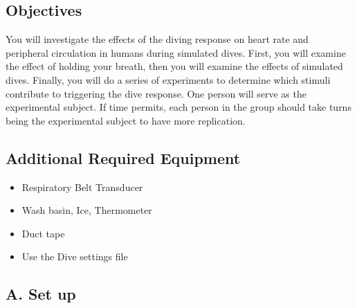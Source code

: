 \documentclass[
  letterpaper,
  DIV=11,
  numbers=noendperiod,
  oneside]{scrartcl}
\providecommand{\tightlist}{%
  \setlength{\itemsep}{0pt}\setlength{\parskip}{0pt}}\usepackage{longtable,booktabs,array}
\begin{document}
\hypertarget{objectives-1}{%
\subsection{Objectives}\label{objectives-1}}

You will investigate the effects of the diving response on heart rate
and peripheral circulation in humans during simulated dives. First, you
will examine the effect of holding your breath, then you will examine
the effects of simulated dives. Finally, you will do a series of
experiments to determine which stimuli contribute to triggering the dive
response. One person will serve as the experimental subject. If time
permits, each person in the group should take turns being the
experimental subject to have more replication.

\hypertarget{additional-required-equipment}{%
\subsection{Additional Required
Equipment}\label{additional-required-equipment}}

\begin{itemize}
\tightlist
\item
  Respiratory Belt Transducer
\item
  Wash basin, Ice, Thermometer
\item
  Duct tape
\item
  Use the Dive settings file
\end{itemize}

\hypertarget{sec-divesetup}{%
\subsection{A. Set up}\label{sec-divesetup}}
\end{document}
